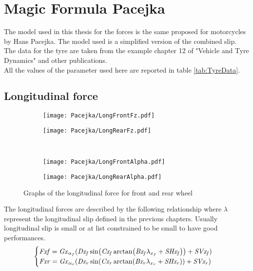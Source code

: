 \chapter{Magic Formula Pacejka}
\label{Ch:MagicFormula}
%
The model used in this thesis for the forces is the same proposed for motorcycles by Hans Pacejka.\cite{pacejka2012tire} The model used is a simplified version of the combined slip.
The data for the tyre are taken from the example chapter 12 of "Vehicle and Tyre Dynamics" and other publications.\cite{sharp2004advances,sharp2014method}\\
All the values of the parameter used here are reported in table \ref{tab:TyreData}.
%
\section{Longitudinal force}
%
\begin{figure}[hbt]
    \begin{subfigure}{.5\linewidth}
        \texttt{[image: Pacejka/LongFrontFz.pdf]}
        \caption{}
        \label{fig:long1a}
    \end{subfigure}%
    \begin{subfigure}{.5\linewidth}
        \texttt{[image: Pacejka/LongRearFz.pdf]}
        \caption{}
        \label{fig:long1b}
    \end{subfigure}\\
    \begin{subfigure}{.5\linewidth}
        \texttt{[image: Pacejka/LongFrontAlpha.pdf]}
        \caption{}
        \label{fig:long1c}
    \end{subfigure}%
    \begin{subfigure}{.5\linewidth}
        \texttt{[image: Pacejka/LongRearAlpha.pdf]}
        \caption{}
        \label{fig:long1d}
    \end{subfigure}
    \caption{Graphs of the longitudinal force for front and rear wheel}
\end{figure}
%
%
The longitudinal forces are described by the following relationship where $\lambda$ represent the longitudinal slip defined in the previous chapters. Usually longitudinal slip is small or at list constrained to be small to have good performances.
%
\begin{equation}
\begin{cases}
{\it Fxf} = {\it Gx}_{\alpha_f} ({\it Dx_f} \sin( {\it Cx_f} \arctan({\it Bx_f}  \lambda_{x_f} + {\it SHx_f}  ) ) + {\it SVx_f})\\
{\it Fxr} = {\it Gx}_{\alpha_r} ({\it Dx_r} \sin( {\it Cx_r} \arctan({\it Bx_r}  \lambda_{x_r} + {\it SHx_r}  ) ) + {\it SVx_r} )
\end{cases}
\end{equation}
